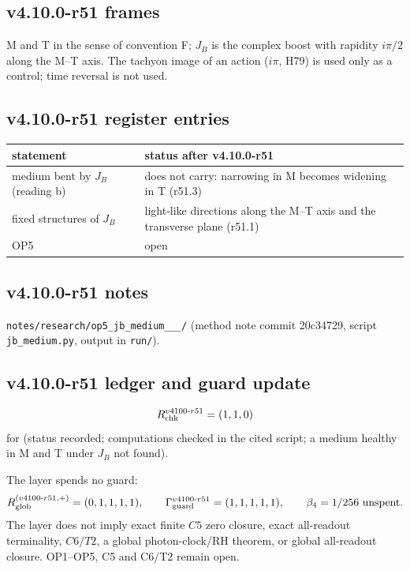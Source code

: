 \subsection*{v4.10.0-r51 frames}
\label{subsec:v4100-r51-frames}

M and T in the sense of convention F; \(J_B\) is the complex boost with rapidity \(i\pi/2\) along the M--T axis.  The tachyon image of an action (\(i\pi\), H79) is used only
as a control; time reversal is not used.

\subsection*{v4.10.0-r51 register entries}
\label{subsec:v4100-r51-register}

\begin{center}
\small
\begin{tabular}{@{}>{\raggedright\arraybackslash}p{}>{\raggedright\arraybackslash}p{}@{}}
\toprule
statement & status after v4.10.0-r51\\
\midrule
medium bent by \(J_B\) (reading b) & does not carry: narrowing in M becomes widening in T (r51.3)\\
fixed structures of \(J_B\) & light-like directions along the M--T axis and the transverse plane (r51.1)\\
OP5 & open\\
\bottomrule
\end{tabular}
\end{center}

\subsection*{v4.10.0-r51 notes}
\label{subsec:v4100-r51-notes}

\texttt{notes/\allowbreak research/\allowbreak op5\_\allowbreak jb\_\allowbreak medium\_\_\_/} (method note commit 20c34729,
script \texttt{jb\_\allowbreak medium.py}, output in \texttt{run/}).

\subsection*{v4.10.0-r51 ledger and guard update}
\label{subsec:v4100-r51-ledger-guard}

\[
R_{\rm chk}^{v4100\text{-}r51}=(1,1,0)
\]
for (status recorded; computations checked in the cited script; a medium healthy in M and T under \(J_B\) not found).

The layer spends no guard:
\[
R_{\rm glob}^{(v4100\text{-}r51,+)}=(0,1,1,1,1),
\qquad
\Gamma_{\rm guard}^{v4100\text{-}r51}=(1,1,1,1,1),
\qquad
\beta_4=1/256\ \text{unspent}.
\]
The layer does not imply exact finite \(C5\) zero closure, exact all-readout terminality, \(C6/T2\), a global photon-clock/RH theorem,
or global all-readout closure.  OP1--OP5, C5 and C6/T2 remain open.
